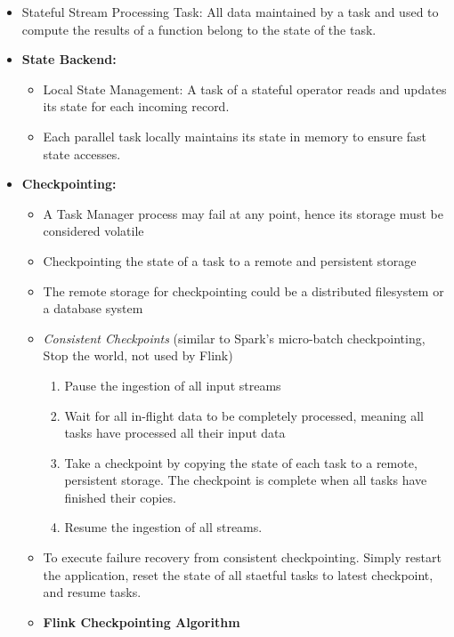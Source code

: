 \documentclass[10pt, landscape]{article}
\begin{document}
\begin{multicols*}{4}
\begin{itemize}
  \item Stateful Stream Processing Task: All data maintained by a task and used to compute the results of a function belong to the state of the task.
  \item \textbf{State Backend:}
       \begin{itemize}
        \item Local State Management: A task of a stateful operator reads and updates its state for each incoming record.
        \item Each parallel task locally maintains its state in memory to ensure fast state accesses.
       \end{itemize}
  \item \textbf{Checkpointing:}
        \begin{itemize}
          \item A Task Manager process may fail at any point, hence its storage must be considered volatile
          \item Checkpointing the state of a task to a remote and persistent storage
          \item The remote storage for checkpointing could be a distributed filesystem or a database system
          \item \textit{Consistent Checkpoints} (similar to Spark's micro-batch checkpointing, Stop the world, not used by Flink)
            \begin{enumerate}
              \item Pause the ingestion of all input streams
              \item Wait for all in-flight data to be completely processed, meaning all tasks have processed all their input data
              \item Take a checkpoint by copying the state of each task to a remote, 
              persistent storage. The checkpoint is complete when all tasks have 
              finished their copies.
              \item Resume the ingestion of all streams.
            \end{enumerate}
          \item To execute failure recovery from consistent checkpointing. Simply restart the application, reset the state of all staetful tasks to latest checkpoint, and resume tasks.
          \item \textbf{Flink Checkpointing Algorithm}
              \begin{itemize}

\end{itemize}
\end{itemize}
\end{itemize}
\end{multicols*}
\end{document}
